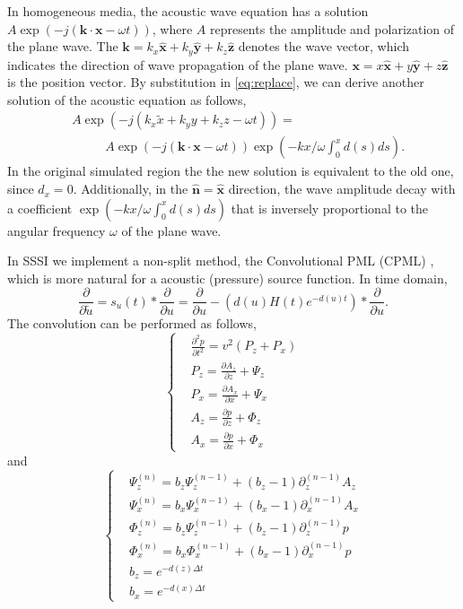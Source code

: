 \documentclass[11pt]{article}
\newcommand{\bx}{\boldsymbol{x}}
\newcommand{\bk}{\boldsymbol{k}}
\newcommand{\hx}{\hat{\mathbf{x}}}
\newcommand{\hy}{\hat{\mathbf{y}}}
\newcommand{\hz}{\hat{\mathbf{z}}}
\theoremstyle{plain}
\theoremstyle{definition}
\theoremstyle{remark}
\numberwithin{equation}{section}
\begin{document}
In homogeneous media, the acoustic wave equation has a solution $A \exp(-j (\bk \cdot \bx -\omega t))$, where $A$ represents the amplitude and polarization of the plane wave. The $\bk = k_x \hx + k_y \hy +k_z \hz$ denotes the wave vector, which 
indicates the direction of wave propagation of the plane wave. $\bx = x\hx +y\hy +z \hz$ is the position vector. By substitution  in \eqref{eq:replace}, we can derive another solution of the acoustic equation as follows,
\begin{equation}
\begin{aligned}
&A\exp(-j(k_x \tilde{x} + k_y y + k_z z -\omega t))=\\
 &~~~~~~~~~~~~A\exp(-j (\bk\cdot \bx -\omega t))\exp(-kx/\omega \int_0^x d(s)ds).
\end{aligned}
\end{equation}
In the original simulated region the the new solution is equivalent to the old one, since $d_x=0$. Additionally, in the $\hat{\mathbf{n}}= \hx$ direction, the wave amplitude decay with a coefficient $\exp(-kx/\omega \int_0^x d(s)ds)$ that is inversely proportional to the angular frequency $\omega$ of the plane wave. 

In SSSI we implement a non-split method, the Convolutional PML (CPML) \cite{Luebbers:1992aa, Roden:2000aa, Komatitsch:2007aa}, which is more natural for a acoustic (pressure) source function. In time domain,
 \begin{equation}
    \frac{\partial}{\partial \tilde{u}} = s_u(t) * \frac{\partial}{\partial u} = \frac{\partial}{\partial u} - \left(d(u)H(t)e^{-d(u)t}\right) * \frac{\partial}{\partial u}.
  \end{equation}
The convolution can be performed as follows,
  \begin{equation}
  \label{eq:fwdTimeCpml}
  \left\{
  \begin{aligned}
  &\frac{\partial^2 p}{\partial t^2}=v^2(P_z+P_x)\\
  &P_z=\frac{\partial A_z}{\partial z}+\Psi_z\\
  &P_x=\frac{\partial A_x}{\partial x}+\Psi_x\\
  &A_z=\frac{\partial p}{\partial z}+\Phi_z\\
  &A_x=\frac{\partial p}{\partial x}+\Phi_x
  \end{aligned}
  \right.
  \end{equation}
  and  
  \begin{equation}
  \label{eq:fwdTimeCpml_var}
  \left\{
  \begin{aligned}
  &\Psi_z^{(n)}=b_z\Psi_z^{(n-1)}+(b_z-1)\partial_z^{(n-1)}A_z\\
  &\Psi_x^{(n)}=b_x\Psi_x^{(n-1)}+(b_x-1)\partial_x^{(n-1)}A_x\\
  &\Phi_z^{(n)}=b_z\Psi_z^{(n-1)}+(b_z-1)\partial_z^{(n-1)}p\\
  &\Phi_x^{(n)}=b_x\Phi_x^{(n-1)}+(b_x-1)\partial_x^{(n-1)}p\\
  &b_z = e^{-d(z)\Delta t}\\
  &b_x = e^{-d(x)\Delta t}
  \end{aligned}
  \right.
  \end{equation}
\end{document}
